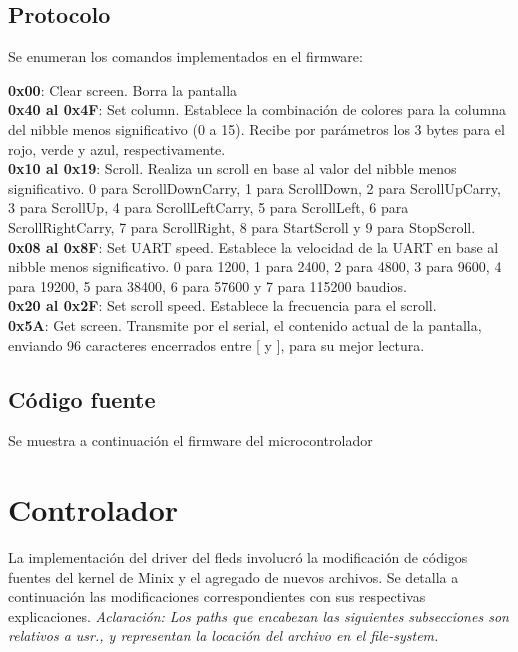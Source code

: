 \documentclass[a4paper,11pt,epsf]{article}
\newcommand{\includescript}[1]{\VerbatimInput[showtabs=1,obeytabs=1,tabsize=8,frame=single,label=\fbox{\bf \large #1},gobble=0, numbers=left, fontsize=\footnotesize]{#1}}
\begin{document}
\subsection{Protocolo}
Se enumeran los comandos implementados en el firmware:


\textbf{0x00}: Clear screen. Borra la pantalla \\


\textbf{0x40 al 0x4F}: Set column. Establece la combinaci\'on de colores para la columna del nibble menos significativo (0 a 15). Recibe por par\'ametros los 3 bytes para el rojo, verde y azul, respectivamente. \\


\textbf{0x10 al 0x19}: Scroll. Realiza un scroll en base al valor del nibble menos significativo. 0 para ScrollDownCarry, 1 para ScrollDown, 2 para ScrollUpCarry, 3 para ScrollUp, 4 para ScrollLeftCarry, 5 para ScrollLeft, 6 para ScrollRightCarry, 7 para ScrollRight, 8 para  StartScroll y 9 para StopScroll. \\


\textbf{0x08 al 0x8F}: Set UART speed. Establece la velocidad de la UART en base al nibble menos significativo.  0 para 1200, 1 para  2400, 2 para 4800, 3 para 9600, 4 para 19200, 5 para 38400, 6 para 57600 y 7 para 115200 baudios. \\


\textbf{0x20 al 0x2F}: Set scroll speed. Establece la frecuencia para el scroll.\\


\textbf{0x5A}: Get screen. Transmite por el serial, el contenido actual de la  pantalla, enviando 96 caracteres encerrados entre [ y ], para su mejor lectura. \\

\subsection{C\'odigo fuente}
Se muestra a continuaci\'on el firmware del microcontrolador

\includescript{main-pic.c}

\section{Controlador}
La implementaci\'on del driver del fleds involucr\'o la modificaci\'on de c\'odigos fuentes del kernel de Minix y el agregado de nuevos archivos. Se detalla a continuaci\'on las modificaciones correspondientes con sus respectivas explicaciones. 
\textit{Aclaraci\'on: Los paths que encabezan las siguientes subsecciones son relativos a \emph{\/usr\/}., y representan la locaci\'on del archivo en el file-system.}
\end{document}
